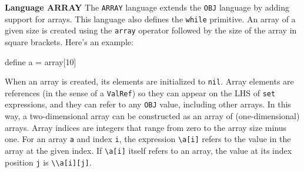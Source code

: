 \begin{minipage}[t]{\sw}
\slidenumber
\LARGE
{\bf Language ARRAY}\exx
The \verb'ARRAY' language extends the \verb'OBJ' language
by adding support for arrays.
This language also defines the \verb'while' primitive.
An array of a given size is created using the \verb'array' operator
followed by the size of the array in square brackets.
Here's an example:
\begin{qv}
define a = array[10]
\end{qv}
When an array is created, its elements are initialized to \verb'nil'.
Array elements are references (in the sense of a \verb'ValRef')
so they can appear on the LHS of \verb'set' expressions,
and they can refer to any \verb'OBJ' value, including other arrays.
In this way, a two-dimensional array can be constructed
as an array of (one-dimensional) arrays.\exx
Array indices are integers that range from zero to the array size minus one.
For an array \verb'a' and index \verb'i',
the expression \verb'\a[i]' refers to the value
in the array at the given index.
If \verb'\a[i]' itself refers to an array,
the value at its index position \verb'j' is \verb'\\a[i][j]'.\exx
\end{minipage}
